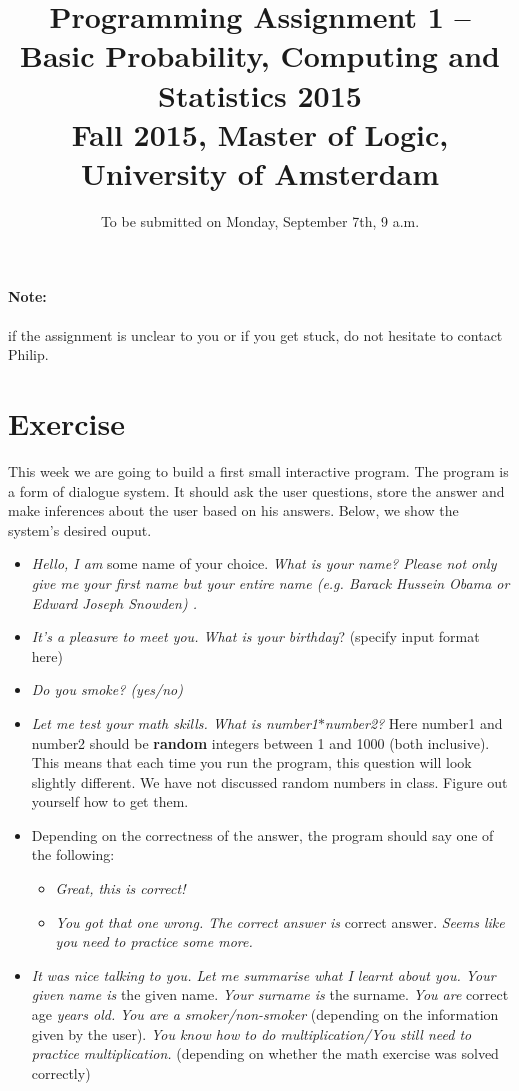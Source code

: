 \documentclass[11pt, leqno, a4paper]{article}
\title{Programming Assignment 1 -- Basic Probability, Computing and Statistics 2015 \\[2mm]
\large{Fall 2015, Master of Logic, University of Amsterdam}}
\author{}
\date{To be submitted on Monday, September 7th, 9 a.m.}
\begin{document}
\maketitle

\paragraph{Note:} if the assignment is unclear to you or if you get stuck, do not hesitate to contact Philip.

\section{Exercise}
This week we are going to build a first small interactive program. The program is a form of dialogue system. It should ask the user questions,
store the answer and make inferences about the user based on his answers. Below, we show the system's desired ouput. 
\begin{itemize}
\item \textit{Hello, I am} some name of your choice. \textit{What is
    your name? Please not only give me your first name but your entire
    name (e.g. \emph{Barack Hussein Obama} or \emph{Edward Joseph Snowden}) .}
\item \textit{It's a pleasure to meet you. What is your birthday}? (specify input format here)
\item \textit{Do you smoke? (yes/no)}
\item \textit{Let me test your math skills. What is number1$ *
    $number2?} Here number1 and number2 should be \textbf{random} integers between 1 and 1000
(both inclusive). This means that each time you run the program, this question will look slightly different. We have not discussed random
numbers in class. Figure out yourself how to get them.
\item Depending on the correctness of the answer, the program should say one of the following:
\begin{itemize}
\item \textit{Great, this is correct!}
\item \textit{You got that one wrong. The correct answer is} correct answer. \textit{Seems like you need to practice some more.}
\end{itemize}
\item \textit{It was nice talking to you. Let me summarise what I learnt about you. Your given name is} the given name. \textit{Your surname is}
the surname. \textit{You are} correct age \textit{years old.} 
\textit{You are a smoker/non-smoker} (depending on the information given by the user). \textit{You know how to do multiplication/You still
need to practice multiplication.} (depending on whether the math exercise was solved correctly)
\end{itemize}
\end{document}
